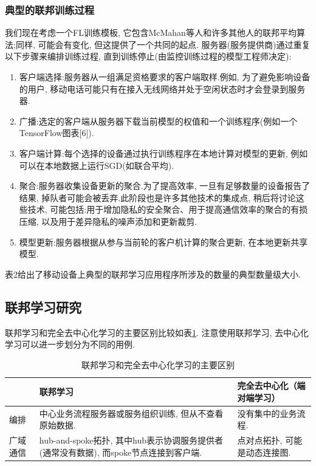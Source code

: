 \documentclass[a4paper]{article}
\begin{document}
\subsubsection{典型的联邦训练过程}
我们现在考虑一个FL训练模板, 它包含McMahan等人\citep{mcmahan2016communication}和许多其他人的联邦平均算法;同样, 可能会有变化, 但这提供了一个共同的起点.
服务器(服务提供商)通过重复以下步骤来编排训练过程, 直到训练停止(由监控训练过程的模型工程师决定):


\begin{enumerate}
\item 客户端选择:服务器从一组满足资格要求的客户端取样.例如, 为了避免影响设备的用户, 移动电话可能只有在接入无线网络并处于空闲状态时才会登录到服务器.
\item 广播:选定的客户端从服务器下载当前模型的权值和一个训练程序(例如一个TensorFlow图表[6]).
\item 客户端计算:每个选择的设备通过执行训练程序在本地计算对模型的更新, 例如可以在本地数据上运行SGD(如联合平均).
\item 聚合:服务器收集设备更新的聚合.为了提高效率, 一旦有足够数量的设备报告了结果, 掉队者可能会被丢弃.此阶段也是许多其他技术的集成点, 稍后将讨论这些技术, 可能包括:用于增加隐私的安全聚合、用于提高通信效率的聚合的有损压缩, 以及用于差异隐私的噪声添加和更新裁剪.
\item 模型更新:服务器根据从参与当前轮的客户机计算的聚合更新, 在本地更新共享模型.
\end{enumerate}
表2给出了移动设备上典型的联邦学习应用程序所涉及的数量的典型数量级大小.


\subsection{联邦学习研究} 

联邦学习和完全去中心化学习的主要区别比较如表\ref{tab:decentralized}.
注意使用联邦学习, 去中心化学习可以进一步划分为不同的用例.
\begin{table}
    \begin{centering}
    \renewcommand{\arraystretch}{1.5}
    \begin{tabularx}{\textwidth}{lXX}
    \toprule
           & \textbf{联邦学习} & \textbf{完全去中心化（端对端学习）} \\
    \midrule  
编排
&中心业务流程服务器或服务组织训练, 但从不查看原始数据.
&没有集中的业务流程.
\\
广域通信
& hub-and-spoke拓扑, 其中hub表示协调服务提供者(通常没有数据), 而spoke节点连接到客户端.
&点对点拓扑, 可能是动态连接图.
\\ 
    \bottomrule
    \end{tabularx}
    \caption{联邦学习和完全去中心化学习的主要区别}
    \label{tab:decentralized}
    \end{centering}
\end{table}
 
\end{document}
